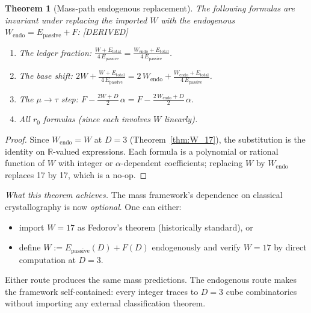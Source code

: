 \documentclass[11pt,a4paper]{article}
\newtheorem{theorem}{Theorem}[section]
\theoremstyle{definition}
\theoremstyle{remark}
\newcommand{\Epass}{E_{\mathrm{passive}}}
\newcommand{\Etot}{E_{\mathrm{total}}}
\newcommand{\DERIVED}{\textcolor{blue!70!black}{\footnotesize\textsf{[DERIVED]}}}
\begin{document}
\begin{theorem}[Mass-path endogenous replacement]
\label{thm:mass_path_invariance}
The following formulas are invariant under replacing the imported $W$ with
the endogenous $W_{\mathrm{endo}} = \Epass + F$: \DERIVED{}
\begin{enumerate}[nosep]
  \item The ledger fraction:
    $\displaystyle\frac{W + \Etot}{4\,\Epass}
    = \frac{W_{\mathrm{endo}} + \Etot}{4\,\Epass}$.

  \item The base shift:
    $\displaystyle 2W + \frac{W + \Etot}{4\,\Epass}
    = 2\,W_{\mathrm{endo}} + \frac{W_{\mathrm{endo}} + \Etot}{4\,\Epass}$.

  \item The $\mu\to\tau$ step:
    $\displaystyle F - \frac{2W + D}{2}\,\alpha
    = F - \frac{2\,W_{\mathrm{endo}} + D}{2}\,\alpha$.

  \item All $r_0$ formulas (since each involves $W$ linearly).
\end{enumerate}
\end{theorem}

\begin{proof}
Since $W_{\mathrm{endo}} = W$ at $D = 3$
(Theorem~\ref{thm:W_17}), the substitution is the identity on
$\mathbb{R}$-valued expressions.  Each formula is a polynomial or rational
function of $W$ with integer or $\alpha$-dependent coefficients; replacing
$W$ by $W_{\mathrm{endo}}$ replaces 17 by 17, which is a no-op.
\end{proof}

\noindent\textit{What this theorem achieves.}\quad
The mass framework's dependence on classical crystallography is now
\emph{optional}.  One can either:
\begin{itemize}[nosep]
  \item import $W = 17$ as Fedorov's theorem (historically standard), or
  \item define $W := \Epass(D) + F(D)$ endogenously and verify $W = 17$
        by direct computation at $D = 3$.
\end{itemize}
Either route produces the same mass predictions.  The endogenous route
makes the framework self-contained: every integer traces to
$D = 3$ cube combinatorics without importing any external classification
theorem.
\end{document}
